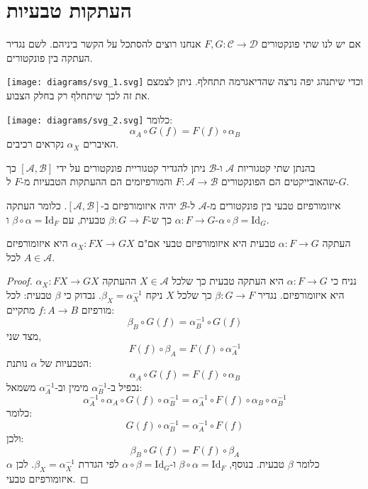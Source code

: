 \documentclass{tstextbook}
\begin{document}
\section{העתקות טבעיות}

אם יש לנו שתי פונקטורים \(F,G:\mathcal{C}\to \mathcal{D}\) אנחנו רוצים להסתכל על הקשר ביניהם. לשם נגדיר העתקה בין פונקטורים.

\texttt{[image: diagrams/svg\_1.svg]}
וכדי שיתנהג יפה נרצה שהדיאגרמה תתחלף. ניתן לצמצם את זה לכך שיתחלף רק בחלק הצבוע.

\texttt{[image: diagrams/svg\_2.svg]}
כלומר:
$$\alpha_{A}\circ  G(f)=F(f)\circ  \alpha_{B}$$
האיברים \(\alpha_{X}\) נקראים רכיבים.

\begin{definition}
בהנתן שתי קטגוריות \(\mathcal{A}\) ו-\(\mathcal{B}\) ניתן להגדיר קטגוריית פונקטורים על ידי \([\mathcal{A},\mathcal{B}]\) כך שהאובייקטים הם הפונקטורים \(F:\mathcal{A}\to \mathcal{B}\) והמורפיזמים הם ההעתקות הטבעיות מ-\(F\) ל-\(G\).

\end{definition}
\begin{definition}
איזומורפיזם טבעי בין פונקטורים מ-\(\mathcal{A}\) ל-\(\mathcal{B}\) יהיה איזומורפיזם ב-\([\mathcal{A},\mathcal{B}]\). כלומר העתקה \(\alpha:F\to G\) כך ש-\(\beta:G\to F\) טבעית, עם \(\beta \circ \alpha = \mathrm{Id}_{F}\) ו-\(\alpha \circ \beta = \mathrm{Id}_{G}\).

\end{definition}
\begin{proposition}
העתקה \(\alpha:F\to G\) טבעית היא איזומורפיזם טבעי אם"ם \(\alpha_{X}:FX\to GX\) היא איזומורפיזם לכל \(A \in \mathcal{A}\).

\end{proposition}
\begin{proof}
נניח כי \(\alpha:F\to G\) היא העתקה טבעית כך שלכל \(X \in \mathcal{A}\) ההעתקה \(\alpha_X:FX\to GX\) היא איזומורפיזם. נגדיר \(\beta:G\to F\) כך שלכל \(X\) ניקח \(\beta_X = \alpha_X^{-1}\). נבדוק כי \(\beta\) טבעית:
לכל מורפיזם \(f:A\to B\) מתקיים:
$$\beta_B \circ G(f) = \alpha_B^{-1} \circ G(f)
$$
מצד שני,
$$F(f) \circ \beta_A = F(f) \circ \alpha_A^{-1}
$$
הטבעיות של \(\alpha\) נותנת:
$$\alpha_A \circ G(f) = F(f) \circ \alpha_B
$$
נכפיל ב-\(\alpha_B^{-1}\) מימין וב-\(\alpha_A^{-1}\) משמאל:
$$\alpha_A^{-1} \circ \alpha_A \circ G(f) \circ \alpha_B^{-1} = \alpha_A^{-1} \circ F(f) \circ \alpha_B \circ \alpha_B^{-1}
$$
כלומר:
$$G(f) \circ \alpha_B^{-1} = \alpha_A^{-1} \circ F(f)
$$
ולכן:
$$\beta_B \circ G(f) = F(f) \circ \beta_A
$$
כלומר \(\beta\) טבעית. בנוסף, \(\beta \circ \alpha = \mathrm{Id}_F\) ו-\(\alpha \circ \beta = \mathrm{Id}_G\) לפי הגדרת \(\beta_X = \alpha_X^{-1}\). לכן \(\alpha\) איזומורפיזם טבעי.

\end{proof}
\end{document}
